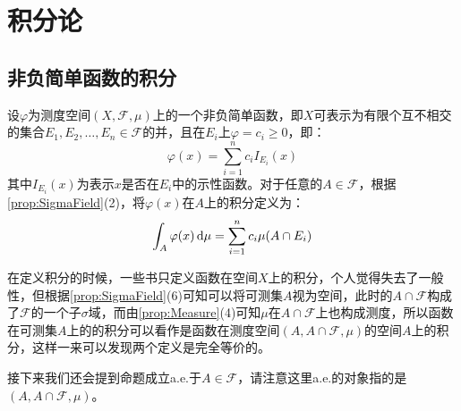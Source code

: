 \section{积分论}

\subsection{非负简单函数的积分}
\begin{definition}
	设$\varphi$为测度空间$(X,\mathscr{F},\mu)$上的一个非负简单函数，即$X$可表示为有限个互不相交的集合$E_1,E_2,\dots,E_n\in \mathscr{F}$的并，且在$E_i$上$\varphi=c_i\geqslant0$，即：
	\begin{equation*}
		\varphi(x)=\sum_{i=1}^{n}c_iI_{E_i}(x)
	\end{equation*}
	其中$I_{E_i}(x)$为表示$x$是否在$E_i$中的示性函数。对于任意的$A\in \mathscr{F}$，根据\cref{prop:SigmaField}(2)，将$\varphi(x)$在$A$上的积分定义为：
	\begin{equation*}
		\int_{A}\varphi(x)\mathop{}\!\mathrm{d}\mu=\sum_{i=1}^{n}c_i\mu(A\cap E_i)
	\end{equation*}
\end{definition}
\begin{note}
	在定义积分的时候，一些书只定义函数在空间$X$上的积分，个人觉得失去了一般性，但根据\cref{prop:SigmaField}(6)可知可以将可测集$A$视为空间，此时的$A\cap\mathscr{F}$构成了$\mathscr{F}$的一个子$\sigma$域，而由\cref{prop:Measure}(4)可知$\mu$在$A\cap\mathscr{F}$上也构成测度，所以函数在可测集$A$上的的积分可以看作是函数在测度空间$(A,A\cap\mathscr{F},\mu)$的空间$A$上的积分，这样一来可以发现两个定义是完全等价的。\par
	接下来我们还会提到命题成立a.e.于$A\in\mathscr{F}$，请注意这里a.e.的对象指的是$(A,A\cap\mathscr{F},\mu)$。
\end{note}

